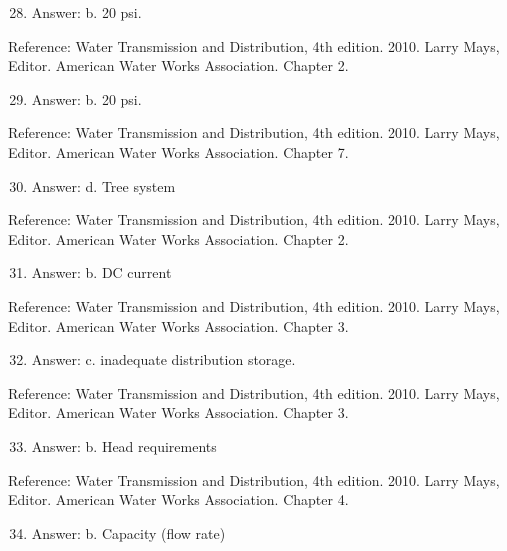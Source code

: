 \documentclass[10pt]{article}
\begin{document}
\begin{enumerate}
  \setcounter{enumi}{27}
  \item Answer: b. 20 psi.
\end{enumerate}

Reference: Water Transmission and Distribution, 4th edition. 2010. Larry Mays, Editor. American Water Works Association. Chapter 2.

\begin{enumerate}
  \setcounter{enumi}{28}
  \item Answer: b. 20 psi.
\end{enumerate}

Reference: Water Transmission and Distribution, 4th edition. 2010. Larry Mays, Editor. American Water Works Association. Chapter 7.

\begin{enumerate}
  \setcounter{enumi}{29}
  \item Answer: d. Tree system
\end{enumerate}

Reference: Water Transmission and Distribution, 4th edition. 2010. Larry Mays, Editor. American Water Works Association. Chapter 2.

\begin{enumerate}
  \setcounter{enumi}{30}
  \item Answer: b. DC current
\end{enumerate}

Reference: Water Transmission and Distribution, 4th edition. 2010. Larry Mays, Editor. American Water Works Association. Chapter 3.

\begin{enumerate}
  \setcounter{enumi}{31}
  \item Answer: c. inadequate distribution storage.
\end{enumerate}

Reference: Water Transmission and Distribution, 4th edition. 2010. Larry Mays, Editor. American Water Works Association. Chapter 3.

\begin{enumerate}
  \setcounter{enumi}{32}
  \item Answer: b. Head requirements
\end{enumerate}

Reference: Water Transmission and Distribution, 4th edition. 2010. Larry Mays, Editor. American Water Works Association. Chapter 4.

\begin{enumerate}
  \setcounter{enumi}{33}
  \item Answer: b. Capacity (flow rate)
\end{enumerate}
\end{document}
